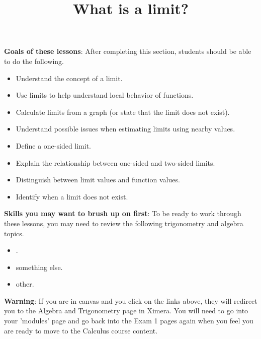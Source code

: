 \documentclass{ximera}
\title{What is a limit?}
\begin{document}
\begin{abstract}
\end{abstract}

\maketitle

\begin{sectionOutcomes}
\textbf{Goals of these lessons}: After completing this section, students should be able to do the following.

\begin{itemize}
	\item Understand the concept of a limit.
    \item Use limits to help understand local behavior of functions.
	\item Calculate limits from a graph (or state that the limit does not exist).
	\item Understand possible issues when estimating limits using
          nearby values.
	\item Define a one-sided limit.
	\item Explain the relationship between one-sided and two-sided limits.
	\item Distinguish between limit values and function values.
	\item Identify when a limit does not exist.
\end{itemize}
\end{sectionOutcomes}

\bigskip

\textbf{Skills you may want to brush up on first}: To be ready to work
through these lessons, you may need to review the following trigonometry and algebra topics.
\begin{itemize}
    \item {}.%
    \item something else.
    \item other.
\end{itemize}

\bigskip

\textbf{Warning}: If you are in canvas and you click on the links above, they will redirect you
to the Algebra and Trigonometry page in Ximera. You will need to
go into your 'modules' page and go back into the Exam 1 pages again
when you feel you are ready to move to the Calculus course content.
\end{document}
